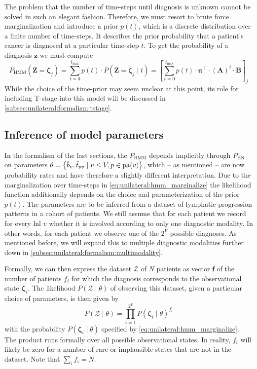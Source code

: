 \documentclass[\relativeRoot/main.tex]{subfiles}
\begin{document}
The problem that the number of time-steps until diagnosis is unknown cannot be solved in such an elegant fashion. Therefore, we must resort to brute force marginalization and introduce a prior $p(t)$, which is a discrete distribution over a finite number of time-steps. It describes the prior probability that a patient's cancer is diagnosed at a particular time-step $t$. To get the probability of a diagnosis $\mathbf{z}$ we must compute
%
\begin{equation} \label{eq:unilateral:hmm_marginalize}
    P_\text{HMM} \left( \mathbf{Z} = \boldsymbol{\zeta}_j \right) = \sum_{t = 0}^{t_\text{max}}{p(t) \cdot P\left( \mathbf{Z} = \boldsymbol{\zeta}_j \mid t \right)} = \left[ \sum_{t = 0}^{t_\text{max}}{p(t) \cdot \boldsymbol{\pi}^\top \cdot (\mathbf{A})^t \cdot \mathbf{B}} \right]_j
\end{equation}
%
While the choice of the time-prior may seem unclear at this point, its role for including T-stage into this model will be discussed in \cref{subsec:unilateral:formalism:tstage}.

\subsection{Inference of model parameters}
\label{subsec:unilateral:formalism:inference}

In the formalism of the last sections, the $P_\text{HMM}$ depends implicitly through $P_\text{BN}$ on parameters $\theta = \left\{ \Tilde{b}_v , \Tilde{t}_{pv} \mid v \leq V , p \in \operatorname{pa}(v) \right\}$, which -- as mentioned -- are now probability rates and have therefore a slightly different interpretation. Due to the marginalization over time-steps in \cref{eq:unilateral:hmm_marginalize} the likelihood function additionally depends on the choice and parameterization of the prior $p(t)$. The parameters are to be inferred from a dataset of lymphatic progression patterns in a cohort of patients. We still assume that for each patient we record for every \gls{lnl} $v$ whether it is involved according to only one diagnostic modality. In other words, for each patient we observe one of the $2^V$ possible diagnoses. As mentioned before, we will expand this to multiple diagnostic modalities further down in \cref{subsec:unilateral:formalism:multimodality}.

Formally, we can then express the dataset $\boldsymbol{\mathcal{Z}}$ of $N$ patients as vector $\mathbf{f}$ of the number of patients $f_i$ for which the diagnosis corresponds to the observational state $\boldsymbol{\zeta}_i$. The likelihood $P \left( \boldsymbol{\mathcal{Z}} \mid \theta \right)$ of observing this dataset, given a particular choice of parameters, is then given by
%
\begin{equation}
    P \left( \boldsymbol{\mathcal{Z}} \mid \theta \right) = \prod_{i=1}^{2^V}{P \left( \boldsymbol{\zeta}_i \mid \theta \right)^{f_i}}
\end{equation}
%
with the probability $P \left( \boldsymbol{\zeta}_i \mid \theta \right)$ specified by \cref{eq:unilateral:hmm_marginalize}. The product runs formally over all possible observational states. In reality, $f_i$ will likely be zero for a number of rare or implausible states that are not in the dataset. Note that $\sum_{i}{f_i} = N$.
\end{document}
